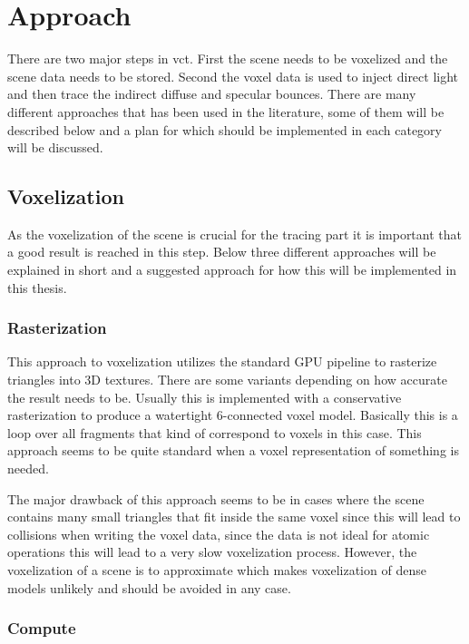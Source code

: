 \documentclass[a4paper, 12pt]{article}
\begin{document}
\section{Approach}
\label{sec:Approach}

There are two major steps in \gls{vct}. First the scene needs to be voxelized and the scene data needs to be stored. Second the voxel data is used to inject direct light and then trace the indirect diffuse and specular bounces. There are many different approaches that has been used in the literature, some of them will be described below and a plan for which should be implemented in each category will be discussed.

\subsection{Voxelization}

As the voxelization of the scene is crucial for the tracing part it is important that a good result is reached in this step. Below three different approaches will be explained in short and a suggested approach for how this will be implemented in this thesis. 

\subsubsection{Rasterization}

This approach to voxelization utilizes the standard GPU pipeline to rasterize triangles into 3D textures. There are some variants depending on how accurate the result needs to be. Usually this is implemented with a conservative rasterization to produce a watertight 6-connected voxel model. Basically this is a loop over all fragments that kind of correspond to voxels in this case. This approach seems to be quite standard when a voxel representation of something is needed.

The major drawback of this approach seems to be in cases where the scene contains many small triangles that fit inside the same voxel since this will lead to collisions when writing the voxel data, since the data is not ideal for atomic operations this will lead to a very slow voxelization process. However, the voxelization of a scene is to approximate which makes voxelization of dense models unlikely and should be avoided in any case. 

\subsubsection{Compute}
\end{document}
